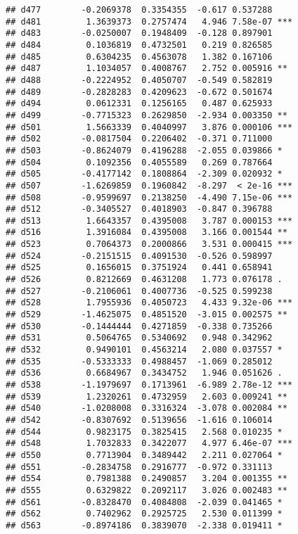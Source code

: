 \documentclass[
]{article}
\begin{document}
\begin{verbatim}
## d477        -0.2069378  0.3354355  -0.617 0.537288    
## d481         1.3639373  0.2757474   4.946 7.58e-07 ***
## d483        -0.0250007  0.1948409  -0.128 0.897901    
## d484         0.1036819  0.4732501   0.219 0.826585    
## d485         0.6304235  0.4563078   1.382 0.167106    
## d487         1.1034057  0.4008767   2.752 0.005916 ** 
## d488        -0.2224952  0.4050707  -0.549 0.582819    
## d489        -0.2828283  0.4209623  -0.672 0.501674    
## d494         0.0612331  0.1256165   0.487 0.625933    
## d499        -0.7715323  0.2629850  -2.934 0.003350 ** 
## d501         1.5663339  0.4040997   3.876 0.000106 ***
## d502        -0.0817504  0.2206402  -0.371 0.711000    
## d503        -0.8624079  0.4196288  -2.055 0.039866 *  
## d504         0.1092356  0.4055589   0.269 0.787664    
## d505        -0.4177142  0.1808864  -2.309 0.020932 *  
## d507        -1.6269859  0.1960842  -8.297  < 2e-16 ***
## d508        -0.9599697  0.2138250  -4.490 7.15e-06 ***
## d512        -0.3405527  0.4018903  -0.847 0.396788    
## d513         1.6643357  0.4395008   3.787 0.000153 ***
## d516         1.3916084  0.4395008   3.166 0.001544 ** 
## d523         0.7064373  0.2000866   3.531 0.000415 ***
## d524        -0.2151515  0.4091530  -0.526 0.598997    
## d525         0.1656015  0.3751924   0.441 0.658941    
## d526         0.8212669  0.4631208   1.773 0.076178 .  
## d527        -0.2106061  0.4007736  -0.525 0.599238    
## d528         1.7955936  0.4050723   4.433 9.32e-06 ***
## d529        -1.4625075  0.4851520  -3.015 0.002575 ** 
## d530        -0.1444444  0.4271859  -0.338 0.735266    
## d531         0.5064765  0.5340692   0.948 0.342962    
## d532         0.9490101  0.4563214   2.080 0.037557 *  
## d535        -0.5333333  0.4988457  -1.069 0.285012    
## d536         0.6684967  0.3434752   1.946 0.051626 .  
## d538        -1.1979697  0.1713961  -6.989 2.78e-12 ***
## d539         1.2320261  0.4732959   2.603 0.009241 ** 
## d540        -1.0208008  0.3316324  -3.078 0.002084 ** 
## d542        -0.8307692  0.5139656  -1.616 0.106014    
## d544         0.9823175  0.3825415   2.568 0.010235 *  
## d548         1.7032833  0.3422077   4.977 6.46e-07 ***
## d550         0.7713904  0.3489442   2.211 0.027064 *  
## d551        -0.2834758  0.2916777  -0.972 0.331113    
## d554         0.7981388  0.2490857   3.204 0.001355 ** 
## d555         0.6329822  0.2092117   3.026 0.002483 ** 
## d561        -0.8328470  0.4084808  -2.039 0.041465 *  
## d562         0.7402962  0.2925725   2.530 0.011399 *  
## d563        -0.8974186  0.3839070  -2.338 0.019411 *  

\end{verbatim}
\end{document}
